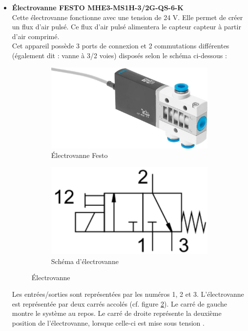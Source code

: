 \begin{itemize}
    \item \textbf{Électrovanne FESTO MHE3-MS1H-3/2G-QS-6-K}\\
          Cette électrovanne fonctionne avec une tension de 24 V.  Elle permet de créer un flux d'air pulsé. Ce flux d'air pulsé alimentera le
          capteur \gls{capteur} à partir d'air comprimé.\\
          Cet appareil possède 3 ports de connexion et 2 commutations différentes (également dit : vanne à 3/2 voies) disposés selon le schéma ci-dessous :
          \begin{figure}[H]
              \centering
              \begin{subfigure}{0.45\textwidth}
                  \includegraphics[scale=0.1]{assets/figures/Electrovanne.jpg}
                  \caption{Électrovanne Festo}
              \end{subfigure}
              \begin{subfigure}{0.45\textwidth}
                  \includegraphics[scale = 0.3]{assets/figures/Electrovanne_InOutput.png}
                  \caption{Schéma d'électrovanne \cite{electrovanne}}
                  \label{fig:electrovanne_InOutput}
              \end{subfigure}
              \caption{Électrovanne}
          \end{figure}
          Les entrées/sorties sont représentées par les numéros 1, 2 et 3. L'électrovanne est représentée par deux carrés accolés (cf. figure
          \ref*{fig:electrovanne_InOutput}). Le carré de gauche montre le système au repos. Le carré de droite représente la deuxième position de
          l'électrovanne, lorsque celle-ci est mise sous tension \cite{electrovanne}.\\
          

\end{itemize}
